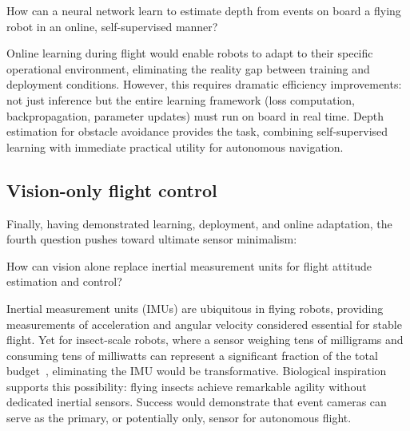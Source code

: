 \begin{tcolorbox}[title={\textbf{Research Question 3}}]
    How can a neural network learn to estimate depth from events on board a flying robot in an online, self-supervised manner?
\end{tcolorbox}

Online learning during flight would enable robots to adapt to their specific operational environment, eliminating the reality gap between training and deployment conditions. However, this requires dramatic efficiency improvements: not just inference but the entire learning framework (loss computation, backpropagation, parameter updates) must run on board in real time. Depth estimation for obstacle avoidance provides the task, combining self-supervised learning with immediate practical utility for autonomous navigation.

\subsection*{Vision-only flight control}

Finally, having demonstrated learning, deployment, and online adaptation, the fourth question pushes toward ultimate sensor minimalism:

\begin{tcolorbox}[title={\textbf{Research Question 4}}]
    How can vision alone replace inertial measurement units for flight attitude estimation and control?
\end{tcolorbox}

Inertial measurement units (IMUs) are ubiquitous in flying robots, providing measurements of acceleration and angular velocity considered essential for stable flight. Yet for insect-scale robots, where a sensor weighing tens of milligrams and consuming tens of milliwatts can represent a significant fraction of the total budget~\cite{yu2025tinysense}, eliminating the IMU would be transformative. Biological inspiration supports this possibility: flying insects achieve remarkable agility without dedicated inertial sensors. Success would demonstrate that event cameras can serve as the primary, or potentially only, sensor for autonomous flight.


